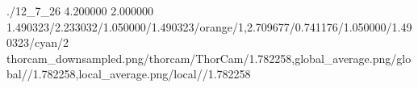 \TrioComparisonFigure
    {./12_7_26}
    {4.200000}
    {2.000000}
    {1.490323/2.233032/1.050000/1.490323/orange/1,2.709677/0.741176/1.050000/1.490323/cyan/2}
    {thorcam_downsampled.png/thorcam/ThorCam/1.782258,global_average.png/global//1.782258,local_average.png/local//1.782258}
